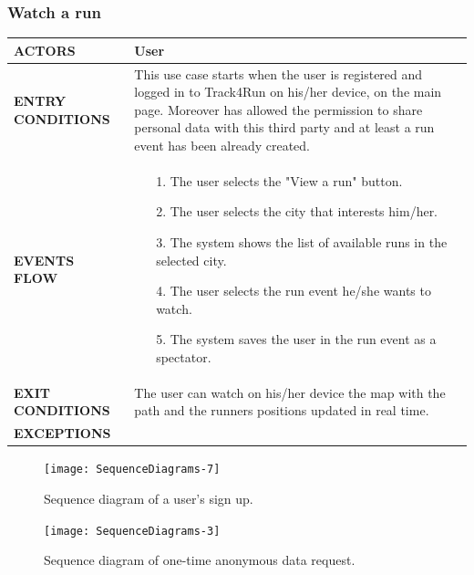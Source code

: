 \documentclass[a4paper]{article}
\begin{document}
\subsubsection{Watch a run}
\begin{center}
\begin{tabular}{|l || p{8cm} ||}
    \hline\bf{ACTORS} & User \\ \hline
    \bf{ENTRY CONDITIONS} & This use case starts when the user is registered and logged in to Track4Run on his/her device, on the main page. Moreover has allowed the permission to share personal data with this third party and at least a run event has been already created. \\ \hline
    \bf{EVENTS FLOW} & \begin{itemize}[noitemsep, topsep=0cm, leftmargin=*] \vspace{-0.2cm}
        \item[1.] The user selects the "View a run" button.
        \item[2.] The user selects the city that interests him/her. 
        \item[3.] The system shows the list of available runs in the selected city.
        \item[4.] The user selects the run event he/she wants to watch.
        \item[5.] The system saves the user in the run event as a spectator.
    \end{itemize}
    \\ \hline
    \bf{EXIT CONDITIONS} & The user can watch on his/her device the map with the path and the runners positions updated in real time. \\ \hline
    \bf{EXCEPTIONS} & \\ \hline \hline
\end{tabular}
\end{center}

\clearpage

\begin{figure}
    \centering
    \texttt{[image: SequenceDiagrams-7]}
    \caption{Sequence diagram of a user's sign up.}
    \label{fig:my_label}
\end{figure}
\clearpage

\begin{figure}
    \centering
    \texttt{[image: SequenceDiagrams-3]}
    \caption{Sequence diagram of one-time anonymous data request.}
    \label{fig:my_label}
\end{figure}
\clearpage
\end{document}
